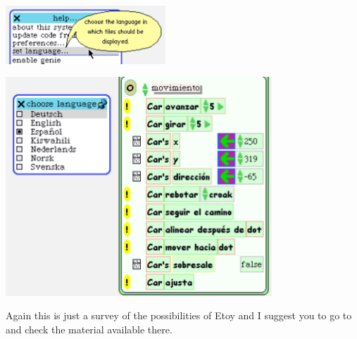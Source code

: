 \begin{center}\includegraphics[width=6cm]{language}\end{center}
\begin{center}\includegraphics[width=10cm]{spanishEtoy}\end{center}




Again this is just a survey of the possibilities of Etoy and I suggest you to go to  and check the material available there. 
\ifx\wholebook\relax\else
\fi
